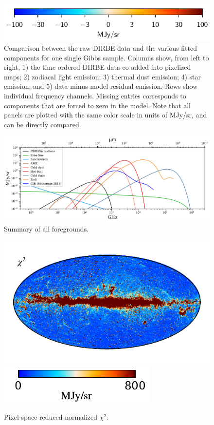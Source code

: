 \documentclass{aa}
\begin{document}
\begin{figure}
  \includegraphics[width=0.50\linewidth]{figs/colourbar_MJysr.pdf}
  \caption{Comparison between the raw DIRBE data and the various fitted components for one single Gibbs sample. Columns show, from left to right, 1) the time-ordered DIRBE data co-added into pixelized maps; 2) zodiacal light emission; 3) thermal dust emission; 4) star emission; and 5) data-minus-model residual emission. Rows show individual frequency channels. Missing entries corresponds to components that are forced to zero in the model. Note that all panels are plotted with the same color scale in units of MJy/sr, and can be directly compared.}
  \label{fig:comp_vs_freq}
\end{figure}

\begin{figure}
	\centering
	\includegraphics[width=\textwidth]{figs/all_fgs.pdf}
	\caption{Summary of all foregrounds.}
	\label{fig:SED_overview}
\end{figure}


\clearpage


\begin{figure}
	\centering
	\includegraphics{figs/chisq_total.pdf}
	\includegraphics{figs/chisq_total_cbar.pdf}
	\caption{Pixel-space reduced normalized $\chi^2$.}
	\label{fig:chisq}
\end{figure}
\end{document}
